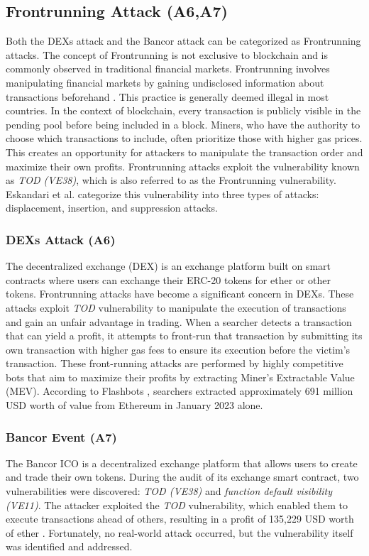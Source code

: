\documentclass[manuscript,screen]{acmart}
\begin{document}
\subsection{Frontrunning Attack (A6,A7)}
Both the DEXs attack and the Bancor attack can be categorized as Frontrunning attacks. The concept of Frontrunning is not exclusive to blockchain and is commonly observed in traditional financial markets. Frontrunning involves manipulating financial markets by gaining undisclosed information about transactions beforehand \cite{TorresCS21}. This practice is generally deemed illegal in most countries. 
In the context of blockchain, every transaction is publicly visible in the pending pool before being included in a block. Miners, who have the authority to choose which transactions to include, often prioritize those with higher gas prices. This creates an opportunity for attackers to manipulate the transaction order and maximize their own profits. 
Frontrunning attacks exploit the vulnerability known as \textit{TOD (VE38)}, which is also referred to as the Frontrunning vulnerability. Eskandari et al. \cite{EskandariMC19} categorize this vulnerability into three types of attacks: displacement, insertion, and suppression attacks.


\subsubsection{DEXs Attack (A6)} 
The decentralized exchange (DEX) is an exchange platform built on smart contracts where users can exchange their ERC-20 tokens for ether or other tokens. Frontrunning attacks have become a significant concern in DEXs. These attacks exploit \textit{TOD} vulnerability to manipulate the execution of transactions and gain an unfair advantage in trading. When a searcher detects a transaction that can yield a profit, it attempts to front-run that transaction by submitting its own transaction with higher gas fees to ensure its execution before the victim's transaction. 
These front-running attacks are performed by highly competitive bots that aim to maximize their profits by extracting Miner's Extractable Value (MEV). According to Flashbots \cite{flashbots}, searchers extracted approximately 691 million USD worth of value from Ethereum in January 2023 alone.

\subsubsection{Bancor Event (A7)}
The Bancor ICO is a decentralized exchange platform that allows users to create and trade their own tokens. During the audit of its exchange smart contract, two vulnerabilities were discovered: \textit{TOD (VE38)} and \textit{function default visibility (VE11)}. The attacker exploited the \textit{TOD} vulnerability, which enabled them to execute transactions ahead of others, resulting in a profit of 135,229 USD worth of ether \cite{Bancor}. Fortunately, no real-world attack occurred, but the vulnerability itself was identified and addressed.
\end{document}
